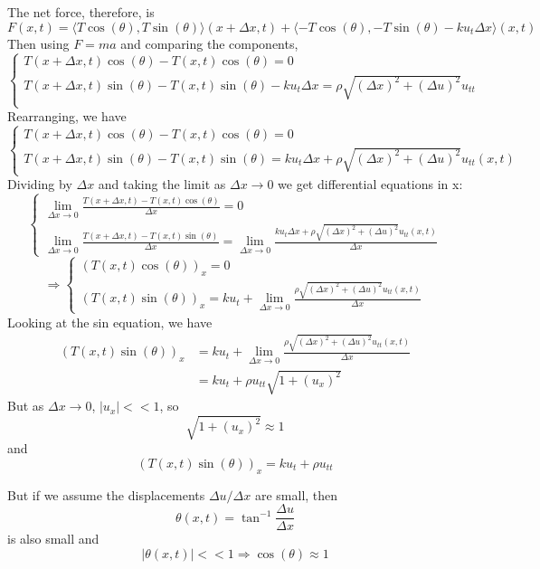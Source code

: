 \documentclass[12pt]{article}
\begin{document}
The net force, therefore, is 
\[F(x, t) = \langle T \cos(\theta), T\sin(\theta)\rangle(x + \Delta x, t) + \langle -T\cos(\theta),-T\sin(\theta) - ku_t\Delta x\rangle(x, t)\]
Then using $F = ma$ and comparing the components,
\[\begin{cases}
    T(x + \Delta x, t)\cos(\theta)- T(x, t) \cos(\theta) = 0\\
    T(x + \Delta x, t)\sin(\theta) - T(x, t)\sin(\theta) - ku_t \Delta x= \rho \sqrt{(\Delta x)^2 + (\Delta u)^2} u_{tt}\\
\end{cases}\]
Rearranging, we have 
\[\begin{cases}
    T(x + \Delta x,t)\cos(\theta) - T(x, t)\cos(\theta) = 0\\
    T(x + \Delta x,t)\sin(\theta) - T(x, t)\sin(\theta) = ku_t \Delta x + \rho \sqrt{(\Delta x)^2 + (\Delta u)^2} u_{tt}(x, t)
\end{cases}\]
Dividing by $\Delta x$ and taking the limit as $\Delta x \to 0$ we get differential equations in x:
\[\begin{cases}
    \lim_{\Delta x \to 0} \frac{T(x + \Delta x,t) - T(x, t)\cos(\theta)}{\Delta x} = 0\\
    \lim_{\Delta x \to 0} \frac{T(x + \Delta x,t) - T(x, t)\sin(\theta)}{\Delta x} = \lim_{\Delta x \to 0} \frac{ku_t \Delta x + \rho \sqrt{(\Delta x)^2 + (\Delta u)^2} u_{tt}(x, t)}{\Delta x}
\end{cases}\]
\[\Longrightarrow \begin{cases}
    (T(x, t)\cos(\theta))_x = 0\\
    (T(x, t)\sin(\theta))_x = ku_t + \lim_{\Delta x \to 0} \frac{\rho \sqrt{(\Delta x)^2 + (\Delta u)^2} u_{tt}(x, t)}{\Delta x}
\end{cases}\]
Looking at the sin equation, we have 
\begin{align*}
    (T(x, t)\sin(\theta))_x &= ku_t + \lim_{\Delta x \to 0} \frac{\rho \sqrt{(\Delta x)^2 + (\Delta u)^2} u_{tt}(x, t)}{\Delta x}\\
    &= ku_t + \rho u_{tt} \sqrt{1 + (u_x)^2}
\end{align*}
But as $\Delta x \to 0$, $|u_x| << 1$, so 
\[\sqrt{1 + (u_x)^2} \approx 1\]
and 
\[(T(x, t)\sin(\theta))_x = ku_t + \rho u_{tt}\]

But if we assume the displacements $\Delta u/\Delta x$ are small, then 
\[\theta(x, t) = \tan^{-1}\frac{\Delta u}{\Delta x}\]
is also small and 
\[|\theta(x, t)| << 1 \Longrightarrow \cos(\theta) \approx 1\]
\end{document}
